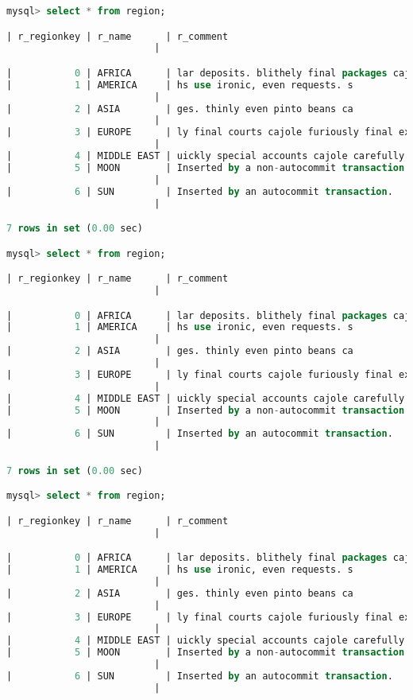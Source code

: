 \documentclass{article}
\begin{document}
\begin{lstlisting}[language=sql]
mysql> select * from region;

| r_regionkey | r_name      | r_comment
                          |

|           0 | AFRICA      | lar deposits. blithely final packages cajole. regular waters are final requests. regular accounts are according to  |
|           1 | AMERICA     | hs use ironic, even requests. s
                          |
|           2 | ASIA        | ges. thinly even pinto beans ca
                          |
|           3 | EUROPE      | ly final courts cajole furiously final excuse
                          |
|           4 | MIDDLE EAST | uickly special accounts cajole carefully blithely close requests. carefully final asymptotes haggle furiousl        |
|           5 | MOON        | Inserted by a non-autocommit transaction.
                          |
|           6 | SUN         | Inserted by an autocommit transaction.
                          |

7 rows in set (0.00 sec)

mysql> select * from region;

| r_regionkey | r_name      | r_comment
                          |

|           0 | AFRICA      | lar deposits. blithely final packages cajole. regular waters are final requests. regular accounts are according to  |
|           1 | AMERICA     | hs use ironic, even requests. s
                          |
|           2 | ASIA        | ges. thinly even pinto beans ca
                          |
|           3 | EUROPE      | ly final courts cajole furiously final excuse
                          |
|           4 | MIDDLE EAST | uickly special accounts cajole carefully blithely close requests. carefully final asymptotes haggle furiousl        |
|           5 | MOON        | Inserted by a non-autocommit transaction.
                          |
|           6 | SUN         | Inserted by an autocommit transaction.
                          |

7 rows in set (0.00 sec)

mysql> select * from region;

| r_regionkey | r_name      | r_comment
                          |

|           0 | AFRICA      | lar deposits. blithely final packages cajole. regular waters are final requests. regular accounts are according to  |
|           1 | AMERICA     | hs use ironic, even requests. s
                          |
|           2 | ASIA        | ges. thinly even pinto beans ca
                          |
|           3 | EUROPE      | ly final courts cajole furiously final excuse
                          |
|           4 | MIDDLE EAST | uickly special accounts cajole carefully blithely close requests. carefully final asymptotes haggle furiousl        |
|           5 | MOON        | Inserted by a non-autocommit transaction.
                          |
|           6 | SUN         | Inserted by an autocommit transaction.
                          |


\end{lstlisting}
\end{document}
